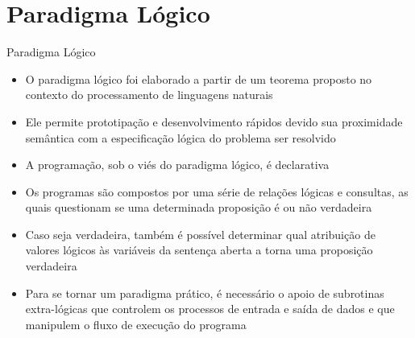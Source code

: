 \section{Paradigma Lógico}


\begin{frame}[fragile]{Paradigma Lógico}

    \begin{itemize}
        \item O paradigma lógico foi elaborado a partir de um teorema proposto no contexto
            do processamento de linguagens naturais

        \item Ele permite prototipação e desenvolvimento rápidos devido sua proximidade
            semântica com a especificação lógica do problema ser resolvido

        \item A programação, sob o viés do paradigma lógico, é declarativa

        \item Os programas são compostos por uma série de relações lógicas e consultas, as
            quais questionam se uma determinada proposição é ou não verdadeira

        \item Caso seja verdadeira, também é possível determinar qual atribuição de valores
            lógicos às variáveis da sentença aberta a torna uma proposição verdadeira

        \item Para se tornar um paradigma prático, é necessário o apoio de subrotinas
            extra-lógicas que controlem os processos de entrada e saída de dados e que 
            manipulem o fluxo de execução do programa
    \end{itemize}

\end{frame}

